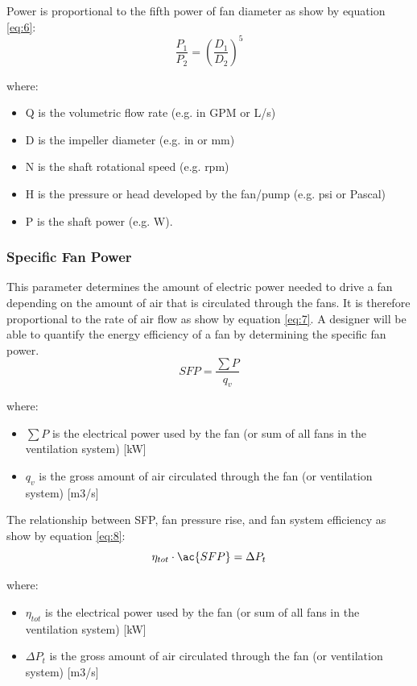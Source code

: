Power is proportional to the fifth power of fan diameter as show by equation \ref{eq:6}:
\begin{equation}
\label{eq:6}
    \frac{P_1}{P_2} = \left(\frac{D_1}{D_2}\right)^5
\end{equation}

where:
\begin{itemize}
\item Q is the volumetric flow rate (e.g. in \ac{GPM} or L/s)
\item D is the impeller diameter (e.g. in or mm)
\item N is the shaft rotational speed (e.g. \ac{rpm})
\item H is the pressure or head developed by the fan/pump (e.g. psi or Pascal)
\item P is the shaft power (e.g. W).
\end{itemize}

\subsubsection{Specific Fan Power}
This parameter determines the amount of electric power needed to drive a fan depending on the amount of air that is circulated through the fans. It is therefore proportional to the rate of air flow as show by equation \ref{eq:7}. A designer will be able to quantify the energy efficiency of a fan by determining the specific fan power.
\begin{equation}
\label{eq:7}
    SFP = \frac{\sum P}{q_v}
\end{equation}

where:

\begin{itemize}
\item  \(\sum P\) is the electrical power used by the fan (or sum of all fans in the ventilation system) [kW]
\item  \(q_v\) is the gross amount of air circulated through the fan (or ventilation system) [m3/s]
\end{itemize}

The relationship between \ac{SFP}, fan pressure rise, and fan system efficiency as show by equation \ref{eq:8}:
\begin{equation}
\label{eq:8}
    \eta_{tot} \cdot \ac{SFP} = \Delta P_t
\end{equation}

where:

\begin{itemize}
\item  \(\eta_{tot}\) is the electrical power used by the fan (or sum of all fans in the ventilation system) [kW]
\item  \(\Delta P_t\) is the gross amount of air circulated through the fan (or ventilation system) [m3/s]
\end{itemize}


